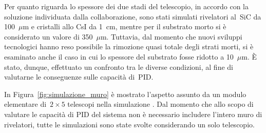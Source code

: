 Per quanto riguarda lo spessore dei due stadi del telescopio, in accordo con la soluzione individuata dalla collaborazione, sono stati simulati rivelatori al~SiC da 100~$\mu$m e cristalli allo CsI da 1~cm, mentre per il substrato morto si è considerato un valore di 350~$\mu$m.
Tuttavia, dal momento che nuovi sviluppi tecnologici hanno reso possibile la rimozione quasi totale degli strati morti, si è esaminato anche il caso in cui lo spessore del substrato fosse ridotto a 10~$\mu$m. 
È stato, dunque, effettuato un confronto tra le diverse condizioni, al fine di valutarne le conseguenze sulle capacità di~PID.







In Figura~\ref{fig:simulazione_muro} è mostrato l'aspetto assunto da un modulo elementare di~$2 \times 5$ telescopi nella simulazione \geant. 
Dal momento che allo scopo di valutare le capacità di PID del sistema non è necessario includere l'intero muro di rivelatori, tutte le simulazioni sono state svolte considerando un solo telescopio.

